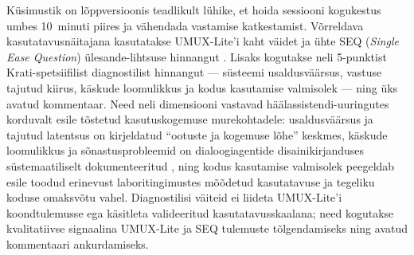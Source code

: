 Küsimustik on lõppversioonis teadlikult lühike, et hoida sessiooni kogukestus umbes 10~minuti piires ja vähendada vastamise katkestamist. Võrreldava kasutatavusnäitajana kasutatakse UMUX-Lite'i kaht väidet ja ühte SEQ (\emph{Single Ease Question}) ülesande-lihtsuse hinnangut \cite{lewis2013umuxlite,sauro2009seq}. Lisaks kogutakse neli 5-punktist Krati-spetsiifilist diagnostilist hinnangut --- süsteemi usaldusväärsus, vastuse tajutud kiirus, käskude loomulikkus ja kodus kasutamise valmisolek --- ning üks avatud kommentaar. Need neli dimensiooni vastavad häälassistendi-uuringutes korduvalt esile tõstetud kasutuskogemuse murekohtadele: usaldusväärsus ja tajutud latentsus on \textcite{luger2016gulf} kirjeldatud \enquote{ootuste ja kogemuse lõhe} keskmes, käskude loomulikkus ja sõnastusprobleemid on dialoogiagentide disainikirjanduses süstemaatiliselt dokumenteeritud \cite{clark2019goodconv}, ning kodus kasutamise valmisolek peegeldab \textcite{sciuto2018alexa} esile toodud erinevust laboritingimustes mõõdetud kasutatavuse ja tegeliku koduse omaksvõtu vahel. Diagnostilisi väiteid ei liideta UMUX-Lite'i koondtulemusse ega käsitleta valideeritud kasutatavusskaalana; need kogutakse kvalitatiivse signaalina UMUX-Lite ja SEQ tulemuste tõlgendamiseks ning avatud kommentaari ankurdamiseks.
